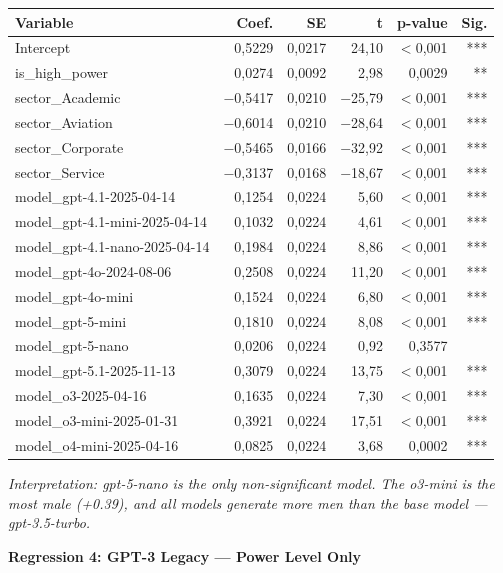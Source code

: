 \documentclass[jair,11pt,letterpaper]{article}
\begin{document}
\begin{table}[H]
\centering
\small
\begin{tabular}{lrrrrr}
\toprule
\textbf{Variable} & \textbf{Coef.} & \textbf{SE} & \textbf{t} & \textbf{p-value} & \textbf{Sig.} \\
\midrule
Intercept & 0,5229 & 0,0217 & 24,10 & $<$0,001 & *** \\
is\_high\_power & 0,0274 & 0,0092 & 2,98 & 0,0029 & ** \\
sector\_Academic & $-$0,5417 & 0,0210 & $-$25,79 & $<$0,001 & *** \\
sector\_Aviation & $-$0,6014 & 0,0210 & $-$28,64 & $<$0,001 & *** \\
sector\_Corporate & $-$0,5465 & 0,0166 & $-$32,92 & $<$0,001 & *** \\
sector\_Service & $-$0,3137 & 0,0168 & $-$18,67 & $<$0,001 & *** \\
model\_gpt-4.1-2025-04-14 & 0,1254 & 0,0224 & 5,60 & $<$0,001 & *** \\
model\_gpt-4.1-mini-2025-04-14 & 0,1032 & 0,0224 & 4,61 & $<$0,001 & *** \\
model\_gpt-4.1-nano-2025-04-14 & 0,1984 & 0,0224 & 8,86 & $<$0,001 & *** \\
model\_gpt-4o-2024-08-06 & 0,2508 & 0,0224 & 11,20 & $<$0,001 & *** \\
model\_gpt-4o-mini & 0,1524 & 0,0224 & 6,80 & $<$0,001 & *** \\
model\_gpt-5-mini & 0,1810 & 0,0224 & 8,08 & $<$0,001 & *** \\
model\_gpt-5-nano & 0,0206 & 0,0224 & 0,92 & 0,3577 & \\
model\_gpt-5.1-2025-11-13 & 0,3079 & 0,0224 & 13,75 & $<$0,001 & *** \\
model\_o3-2025-04-16 & 0,1635 & 0,0224 & 7,30 & $<$0,001 & *** \\
model\_o3-mini-2025-01-31 & 0,3921 & 0,0224 & 17,51 & $<$0,001 & *** \\
model\_o4-mini-2025-04-16 & 0,0825 & 0,0224 & 3,68 & 0,0002 & *** \\
\bottomrule
\end{tabular}
\end{table}

\noindent\textit{Interpretation: gpt-5-nano is the only non-significant model. The
o3-mini is the most male (+0.39), and all models generate more men
than the base model --- gpt-3.5-turbo.}

\vspace{0.5cm}
\noindent\textbf{Regression 4: GPT-3 Legacy --- Power Level Only}
\end{document}
